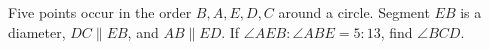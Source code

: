 Five points occur in the order $B,A,E,D,C$ around a circle. Segment $EB$ is a diameter, $DC\parallel EB$, and $AB\parallel ED$. If $\angle AEB:\angle ABE=5:13$, find $\angle BCD$.
